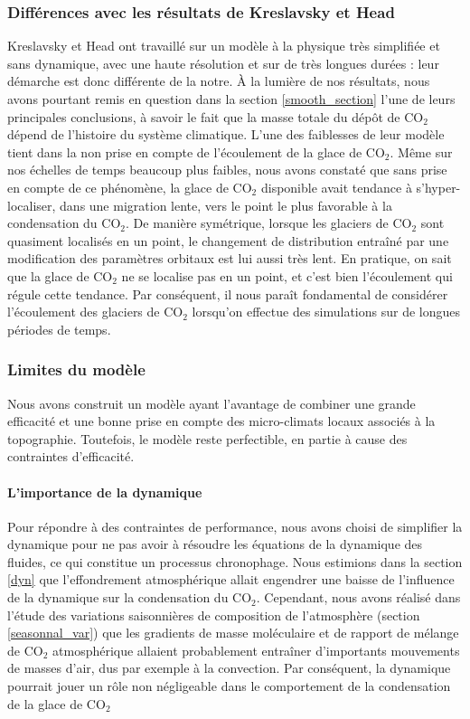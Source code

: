 \documentclass[11pt,a4paper]{article}
\begin{document}
\subsubsection{Différences avec les résultats de Kreslavsky et Head}
Kreslavsky et Head ont travaillé sur un modèle à la physique très simplifiée et sans dynamique, avec une haute résolution et sur de très longues durées : leur démarche est donc différente de la notre. À la lumière de nos résultats, nous avons pourtant remis en question dans la section \ref{smooth_section} l'une de leurs principales conclusions, à savoir le fait que la masse totale du dépôt de CO$_2$ dépend de l'histoire du système climatique. L'une des faiblesses de leur modèle tient dans la non prise en compte de l'écoulement de la glace de CO$_2$.  Même sur nos échelles de temps beaucoup plus faibles, nous avons constaté que sans prise en compte de ce phénomène, la glace de CO$_2$ disponible avait tendance à s'hyper-localiser, dans une migration lente, vers le point le plus favorable à la condensation du CO$_2$. De manière symétrique, lorsque les glaciers de CO$_2$ sont quasiment localisés en un point, le changement de distribution entraîné par une modification des paramètres orbitaux est lui aussi très lent. En pratique, on sait que la glace de CO$_2$ ne se localise pas en un point, et c'est bien l'écoulement qui régule cette tendance. Par conséquent, il nous paraît fondamental de considérer l'écoulement des glaciers de CO$_2$ lorsqu'on effectue des simulations sur de longues périodes de temps. \\

\subsubsection{Limites du modèle}
Nous avons construit un modèle ayant l'avantage de combiner une grande efficacité et une bonne prise en compte des micro-climats locaux associés à la topographie. Toutefois, le modèle reste perfectible, en partie à cause des contraintes d'efficacité.

\paragraph{L'importance de la dynamique \\}
Pour répondre à des contraintes de performance, nous avons choisi de simplifier la dynamique pour ne pas avoir à résoudre les équations de la dynamique des fluides, ce qui constitue un processus chronophage. Nous estimions dans la section \ref{dyn} que l'effondrement atmosphérique allait engendrer une baisse de l'influence de la dynamique sur la condensation du CO$_2$. Cependant, nous avons réalisé dans l'étude des variations saisonnières de composition de l'atmosphère (section \ref{seasonnal_var}) que les gradients de masse moléculaire et de rapport de mélange de CO$_2$ atmosphérique allaient probablement entraîner d'importants mouvements de masses d'air, dus par exemple à la convection. Par conséquent, la dynamique pourrait jouer un rôle non négligeable dans le comportement de la condensation de la glace de CO$_2$ \\
\end{document}
